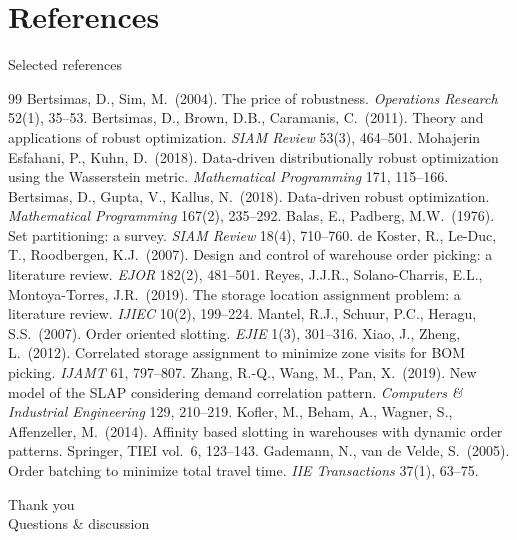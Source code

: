 \documentclass[11pt,aspectratio=169]{beamer}
\begin{document}
\section*{References}
\begin{frame}[allowframebreaks]{Selected references}
  \footnotesize
  \begin{thebibliography}{99}
     Bertsimas, D., Sim, M.\ (2004). The price of robustness. \emph{Operations Research} 52(1), 35--53.
     Bertsimas, D., Brown, D.B., Caramanis, C.\ (2011). Theory and applications of robust optimization. \emph{SIAM Review} 53(3), 464--501.
     Mohajerin Esfahani, P., Kuhn, D.\ (2018). Data-driven distributionally robust optimization using the Wasserstein metric. \emph{Mathematical Programming} 171, 115--166.
     Bertsimas, D., Gupta, V., Kallus, N.\ (2018). Data-driven robust optimization. \emph{Mathematical Programming} 167(2), 235--292.
     Balas, E., Padberg, M.W.\ (1976). Set partitioning: a survey. \emph{SIAM Review} 18(4), 710--760.
     de Koster, R., Le-Duc, T., Roodbergen, K.J.\ (2007). Design and control of warehouse order picking: a literature review. \emph{EJOR} 182(2), 481--501.
     Reyes, J.J.R., Solano-Charris, E.L., Montoya-Torres, J.R.\ (2019). The storage location assignment problem: a literature review. \emph{IJIEC} 10(2), 199--224.
     Mantel, R.J., Schuur, P.C., Heragu, S.S.\ (2007). Order oriented slotting. \emph{EJIE} 1(3), 301--316.
     Xiao, J., Zheng, L.\ (2012). Correlated storage assignment to minimize zone visits for BOM picking. \emph{IJAMT} 61, 797--807.
     Zhang, R.-Q., Wang, M., Pan, X.\ (2019). New model of the SLAP considering demand correlation pattern. \emph{Computers \& Industrial Engineering} 129, 210--219.
     Kofler, M., Beham, A., Wagner, S., Affenzeller, M.\ (2014). Affinity based slotting in warehouses with dynamic order patterns. Springer, TIEI vol.\ 6, 123--143.
     Gademann, N., van de Velde, S.\ (2005). Order batching to minimize total travel time. \emph{IIE Transactions} 37(1), 63--75.
  \end{thebibliography}
\end{frame}

\begin{frame}[plain]
  \centering
  \vfill
  {\Large Thank you}\\[0.5em]
  {\normalsize Questions \& discussion}
  \vfill
\end{frame}
\end{document}

